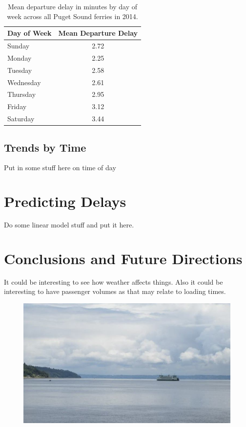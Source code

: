 \documentclass[11pt, letterpaper]{article}
\begin{document}
\begin{table}[ht]
\centering
\begin{tabular}{lc}
  \hline
 Day of Week & Mean Departure Delay \\ 
  \hline
 Sunday & 2.72 \\ 
 Monday & 2.25 \\ 
 Tuesday & 2.58 \\ 
 Wednesday & 2.61 \\ 
 Thursday & 2.95 \\ 
 Friday & 3.12 \\ 
 Saturday & 3.44 \\ 
   \hline
\end{tabular}
\caption{Mean departure delay in minutes by day of week across all Puget Sound ferries in 2014.}
\label{weekday}
\end{table}



\subsection*{Trends by Time}

Put in some stuff here on time of day


\section*{Predicting Delays}

Do some linear model stuff and put it here.




\section*{Conclusions and Future Directions}

It could be interesting to see how weather affects things. Also it could be interesting to have passenger volumes as that may relate to loading times.


\begin{figure}
\begin{center}
\includegraphics[scale = .55]{ferry2.jpg}
\end{center}
\end{figure}
\end{document}
